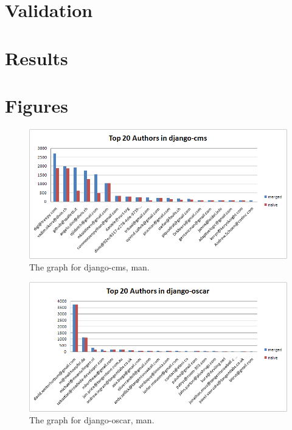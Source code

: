 \documentclass{article}
\begin{document}
\section{Validation}
\section{Results}




\clearpage
\appendix
\section{Figures}

\begin{figure}[h]
  \centering
  \includegraphics[width=1\textwidth]{../presentation/img/graph-django-cms.png}
  \caption{The graph for django-cms, man.}
  \label{fig:graph-django-cms}
\end{figure}

\begin{figure}[h]
  \centering
  \includegraphics[width=1\textwidth]{../presentation/img/graph-django-oscar.png}
  \caption{The graph for django-oscar, man.}
  \label{fig:graph-django-oscar}
\end{figure}
\end{document}
